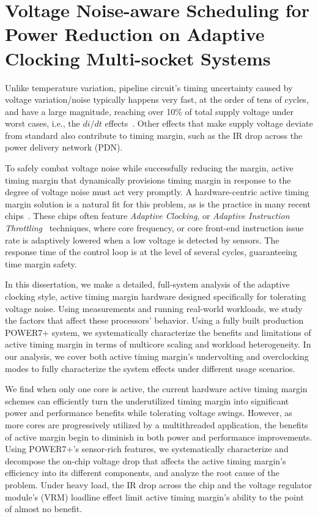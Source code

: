 
\chapter{Voltage Noise-aware Scheduling for Power Reduction on Adaptive Clocking Multi-socket Systems}

\label{sec:voltage}

Unlike temperature variation, pipeline circuit's timing uncertainty caused by voltage variation/noise typically happens very fast, at the order of tens of cycles, and have a large magnitude, reaching over 10\% of total supply voltage under worst cases, i.e., the $di/dt$ effects~\cite{reddi2010voltage}. Other effects that make supply voltage deviate from standard also contribute to timing margin, such as the IR drop across the power delivery network (PDN).

To safely combat voltage noise while successfully reducing the margin, active timing margin that dynamically provisions timing margin in response to the degree of voltage noise must act very promptly. A hardware-centric active timing margin solution is a natural fit for this problem, as is the practice in many recent chips~\cite{kurd2008next,lefurgy2011active,bowman201222nm,grenat20145,tokunaga20145,bowman20158}. These chips often feature \textit{Adaptive Clocking}, or \textit{Adaptive Instruction Throttling}~\cite{webel2015robust} techniques, where core frequency, or core front-end instruction issue rate is adaptively lowered when a low voltage is detected by sensors. The response time of the control loop is at the level of several cycles, guaranteeing time margin safety.

In this dissertation, we make a detailed, full-system analysis of the adaptive clocking style, active timing margin hardware designed specifically for tolerating voltage noise. Using measurements and running real-world workloads, we study the factors that affect these processors' behavior. Using a fully built production POWER7+ system, we systematically characterize the benefits and limitations of active timing margin in terms of multicore scaling and workload heterogeneity. In our analysis, we cover both active timing margin's undervolting and overclocking modes to fully characterize the system effects under different usage scenarios. 

We find when only one core is active, the current hardware active timing margin schemes can efficiently turn the underutilized timing margin into significant power and performance benefits while tolerating voltage swings. However, as more cores are progressively utilized by a multithreaded application, the benefits of active margin begin to diminish in both power and performance improvements. Using POWER7+'s sensor-rich features, we systematically characterize and decompose the on-chip voltage drop that affects the active timing margin's efficiency into its different components, and analyze the root cause of the problem. Under heavy load, the IR drop across the chip and the voltage regulator module's (VRM) loadline effect limit active timing margin's ability to the point of almost no benefit. 

